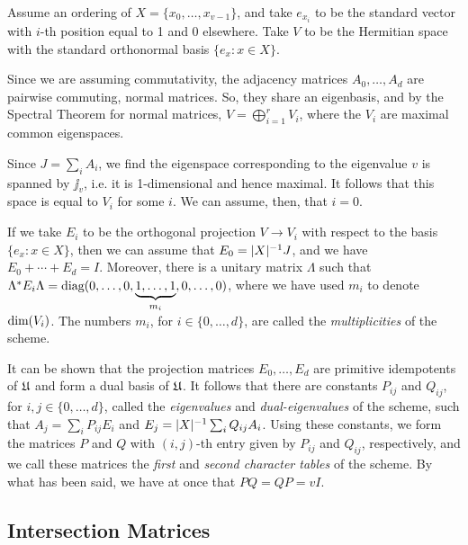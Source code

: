 \documentclass[../../../main]{subfiles}
\begin{document}
 Assume an ordering of $X=\{x_0, \dots, x_{v-1}\}$, and take $e_{x_i}$ to be the
 standard vector with $i$-th position equal to 1 and 0 elsewhere. Take $V$ to be
 the Hermitian space with the standard orthonormal basis $\{e_x : x \in X\}$.  
 
 Since we are assuming commutativity, the adjacency matrices $A_0, \dots, A_d$
 are pairwise commuting, normal matrices. So, they share an eigenbasis, and by
 the Spectral Theorem for normal matrices, $V= \bigoplus_{i=1}^r V_i$, where the
 $V_i$ are maximal common eigenspaces.  
 
 Since $J=\sum_i A_i$, we find the eigenspace corresponding to the eigenvalue
 $v$ is spanned by $\jj_v$, i.e. it is 1-dimensional and hence maximal. It
 follows that this space is equal to $V_i$ for some $i$. We can assume, then,
 that $i=0$. 
 
 If we take $E_i$ to be the orthogonal projection $V \rightarrow V_i$ with
 respect to the basis $\{e_x : x \in X\}$, then we can assume that
 $E_0=|X|^{-1}J$, and we have $E_0 + \cdots + E_d = I$. Moreover, there is a
 unitary matrix $\Lambda$ such that $\Lambda^* E_i \Lambda =
 \text{diag}(0,\dots,0,\underbrace{1,\dots,1}_{m_i},0,\dots,0)$, where we have used
 $m_i$ to denote $\text{dim}(V_i)$. The numbers $m_i$, for $i \in \{0, \dots, d\}$,
 are called the {\it multiplicities} of the scheme. 
 
 It can be shown \cite[see][Theorem 3.1]{bannaialgebraic} that the projection
 matrices $E_0, \dots, E_d$ are primitive idempotents of $\mathfrak{U}$ and form a dual
 basis of $\mathfrak{U}$. It follows that there are constants $P_{ij}$ and $Q_{ij}$, for
 $i,j \in \{0, \dots, d\}$, called the {\it eigenvalues} and {\it dual-eigenvalues} of the
 scheme, such that $A_j=\sum_i P_{ij}E_i$ and $E_j=|X|^{-1}\sum_i
 Q_{ij}A_i$. Using these constants, we form the matrices $P$ and $Q$ with
 $(i,j)$-th entry given by $P_{ij}$ and $Q_{ij}$, respectively, and we call
 these matrices the {\it first} and {\it second character
   tables} of the scheme. By what has been said, we have
 at once that $PQ=QP=vI$. 
 
 \dinkus

 
  \subsection{Intersection Matrices}
 
\end{document}
